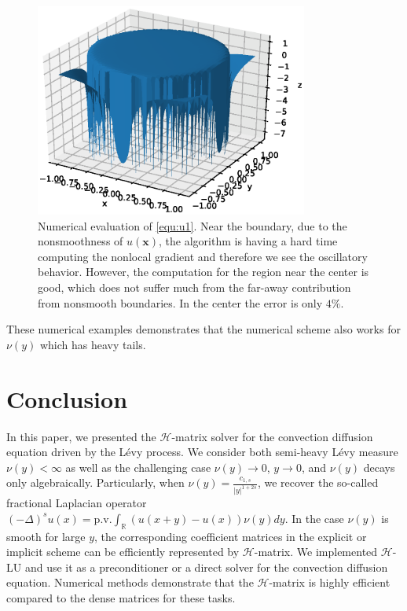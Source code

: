 \documentclass[3p,,preprint,12pt]{elsarticle}
\newcommand{\RR}[0]{\mathbb{R}}
\newcommand{\bx}[0]{\mathbf{x}}
\theoremstyle{definition}
\begin{document}
\begin{figure}[H] %
\centering
\includegraphics[width=0.8\textwidth,keepaspectratio]{figures/fig8}
\caption{Numerical evaluation of \cref{equ:u1}. Near the boundary, due to the nonsmoothness of $u(\bx)$, the algorithm is having a hard time computing the nonlocal gradient and therefore we see the oscillatory behavior. However, the computation for the region near the center is  good, which does not suffer much from the far-away contribution from nonsmooth boundaries. In the center the error is only $4\%$.}
\label{fig:fig8}
\end{figure}

These numerical examples demonstrates that the numerical scheme also works for $\nu(y)$ which has heavy tails. 



\section{Conclusion}

In this paper, we presented the $\mathcal{H}$-matrix solver for the convection diffusion equation driven by the L\'evy process. We consider both semi-heavy L\'evy measure $\nu(y)<\infty$ as well as the challenging case $\nu(y)\rightarrow 0$, $y\rightarrow 0$, and $\nu(y)$ decays only algebraically. Particularly, when $\nu(y) = \frac{c_{1,s}}{|y|^{1+2s}}$, we recover the so-called fractional Laplacian operator $(-\Delta)^s u(x) =\mathrm{p.v.} \int_{\RR} (u(x+y)-u(x))\nu(y)dy$. In the case $\nu(y)$ is smooth for large $y$, the corresponding coefficient matrices in the explicit or implicit scheme can be efficiently represented by $\mathcal{H}$-matrix. We implemented $\mathcal{H}$-LU and use it as a preconditioner or a direct solver for the convection diffusion equation. Numerical methods demonstrate that the $\mathcal{H}$-matrix is highly efficient compared to the dense matrices for these tasks. 
\end{document}
